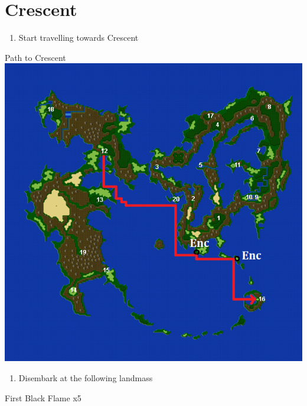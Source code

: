 \chapter{Crescent}

\vspace{\baselineskip}

\begin{paracol}{2}

\begin{enumerate}
    \item Start travelling towards Crescent
\end{enumerate}

\switchcolumn
\begin{misc}{Path to Crescent}
    \includegraphics[scale=0.8]{../Graphics/Maps/2. To Crescent.png}
\end{misc}

\switchcolumn*
\begin{enumerate}[resume]
    \item Disembark at the following landmass
\end{enumerate}

\switchcolumn
\begin{steproute}{First Black Flame x5}
\end{steproute}


\end{paracol}
